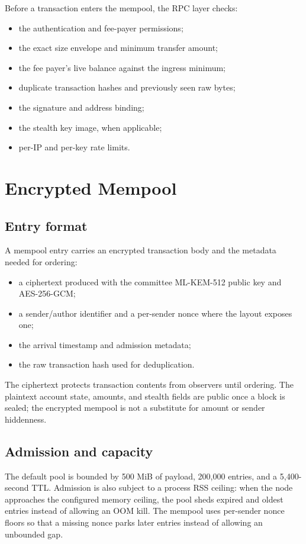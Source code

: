 \documentclass[11pt,a4paper]{article}
\begin{document}
Before a transaction enters the mempool, the RPC layer checks:
\begin{itemize}[leftmargin=*]
  \item the authentication and fee-payer permissions;
  \item the exact size envelope and minimum transfer amount;
  \item the fee payer's live balance against the ingress minimum;
  \item duplicate transaction hashes and previously seen raw bytes;
  \item the signature and address binding;
  \item the stealth key image, when applicable;
  \item per-IP and per-key rate limits.
\end{itemize}

\section{Encrypted Mempool}

\subsection{Entry format}

A mempool entry carries an encrypted transaction body and the metadata needed
for ordering:
\begin{itemize}[leftmargin=*]
  \item a ciphertext produced with the committee ML-KEM-512 public key and
        AES-256-GCM;
  \item a sender/author identifier and a per-sender nonce where the layout
        exposes one;
  \item the arrival timestamp and admission metadata;
  \item the raw transaction hash used for deduplication.
\end{itemize}

The ciphertext protects transaction contents from observers until ordering.
The plaintext account state, amounts, and stealth fields are public once a
block is sealed; the encrypted mempool is not a substitute for amount or
sender hiddenness.

\subsection{Admission and capacity}

The default pool is bounded by 500 MiB of payload, 200,000 entries, and a
5,400-second TTL. Admission is also subject to a process RSS ceiling: when the
node approaches the configured memory ceiling, the pool sheds expired and
oldest entries instead of allowing an OOM kill. The mempool uses per-sender
nonce floors so that a missing nonce parks later entries instead of allowing
an unbounded gap.
\end{document}
